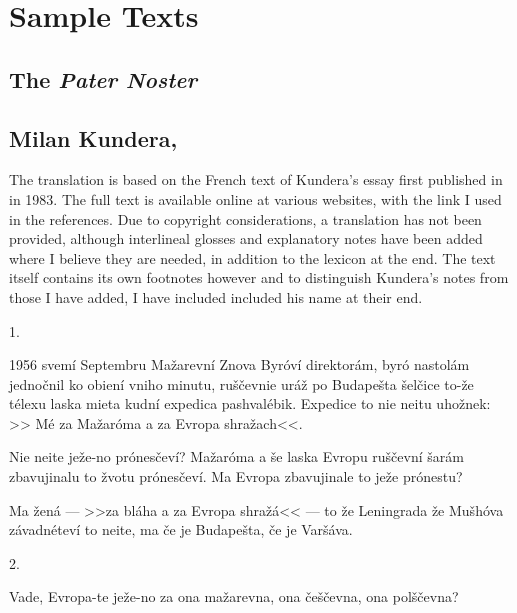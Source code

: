 \chapter{Sample Texts}

\section{The \emph{Pater Noster}}

\section{Milan Kundera, }

{\small
The translation is based on the French text of Kundera's essay  first published in  in 1983. The full text is available online at various websites, with the link I used in the references. Due to copyright considerations, a translation has not been provided, although interlineal glosses and explanatory notes have been added where  I believe they are needed, in addition to the lexicon at the end. The text itself contains its own footnotes however and to distinguish Kundera's notes from those I have added, I have included included his name at their end.
}

\begin{center}1.\end{center}
1956 svem\'i Septembru Ma\v{z}arevn\'i Znova Byr\'ov\'i direktor\'am, byr\'o
nastol\'am jedno\v{c}nil ko obien\'i vniho minutu, ru\v{s}\v{c}evnie ur\'a\v{z}
po Budape\v{s}ta \v{s}el\v{c}ice to-\v{z}e t\'elexu laska mieta kudn\'i expedica
pashval\'ebik. Expedice to nie neitu uho\v{z}nek: >> M\'e za Ma\v{z}ar\'oma a
za Evropa shra\v{z}ach<<.

Nie neite je\v{z}e-no pr\'ones\v{c}ev\'i? Ma\v{z}ar\'oma a \v{s}e laska Evropu ru\v{s}\v{c}evn\'i \v{s}ar\'am zbavujinalu to \v{z}votu pr\'ones\v{c}ev\'i. Ma Evropa zbavujinale to je\v{z}e pr\'onestu?

Ma \v{z}en\'a --- >>za bl\'aha a za Evropa shra\v{z}\'a<< --- to \v{z}e Leningrada \v{z}e Mu\v{s}h\'ova z\'avadn\'etev\'i to neite, ma \v{c}e je Budape\v{s}ta, \v{c}e je Var\v{s}\'ava.

\begin{center}2.\end{center}
Vade, Evropa-te je\v{z}e-no za ona ma\v{z}arevna, ona \v{c}e\v{s}\v{c}evna, ona pol\v{s}\v{c}evna?
